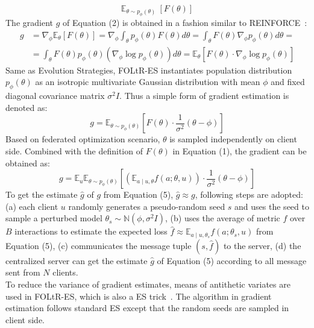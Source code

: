 \begin{equation}
	 \mathbb{E}_{\theta\sim p_{\phi}(\theta)}~[F(\theta)]
\end{equation}
The gradient $g$ of Equation (2) is obtained in a fashion similar to REINFORCE~\cite{williams1992simple}:
\begin{equation}
	\begin{aligned}
		g &=\nabla_{\phi} \mathbb{E}_{\theta}[F(\theta)]=\nabla_{\phi} \int_{\theta} p_{\phi}(\theta) F(\theta) d \theta=\int_{\theta} F(\theta) \nabla_{\phi} p_{\phi}(\theta) d \theta=\\
		&=\int_{\theta} F(\theta) p_{\phi}(\theta)\left(\nabla_{\phi} \log p_{\phi}(\theta)\right) d \theta=\mathbb{E}_{\theta}\left[F(\theta) \cdot \nabla_{\phi} \log p_{\phi}(\theta)\right]
	\end{aligned}
\end{equation}
Same as Evolution Strategies, FOLtR-ES instantiates population distribution $p_{\phi}(\theta)$ as an isotropic multivariate Gaussian distribution with mean $\phi$ and fixed diagonal covariance matrix $\sigma^2I$. Thus a simple form of gradient estimation is denoted as:
\begin{equation}
	g=\mathbb{E}_{\theta \sim p_{\phi}(\theta)}\left[F(\theta) \cdot \frac{1}{\sigma^{2}}(\theta-\phi)\right]
\end{equation}
Based on federated optimization scenario, $\theta$ is sampled independently on client side. Combined with the definition of $F(\theta)$ in Equation (1), the gradient can be obtained as:
\begin{equation}
	g=\mathbb{E}_{u} \mathbb{E}_{\theta \sim p_{\phi}(\theta)}\left[\left(\mathbb{E}_{a \mid u, \theta} f(a ; \theta, u)\right) \cdot \frac{1}{\sigma^{2}}(\theta-\phi)\right]
\end{equation}
To get the estimate $\hat{g}$ of $g$ from Equation (5), $\hat{g} \approx g$, following steps are adopted: (a) each client $u$ randomly generates a pseudo-random seed $s$ and uses the seed to sample a perturbed model $\theta_{s} \sim \mathbb{N}\left(\phi, \sigma^{2} I\right)$, (b) uses the average of metric $f$ over $B$ interactions to estimate the expected loss $\hat{f} \approx \mathbb{E}_{a \mid u, \theta_{s}} f(a;\theta_s, u) $ from Equation (5), (c) communicates the message tuple $(s,\hat{f})$ to the server, (d) the centralized server can get the estimate $\hat{g}$ of Equation (5) according to all message sent from $N$ clients.\\
To reduce the variance of gradient estimates, means of antithetic variates are used in FOLtR-ES, which is also a ES trick~\cite{salimans2017evolution}. The algorithm in gradient estimation follows standard ES except that the random seeds are sampled in client side.\\
